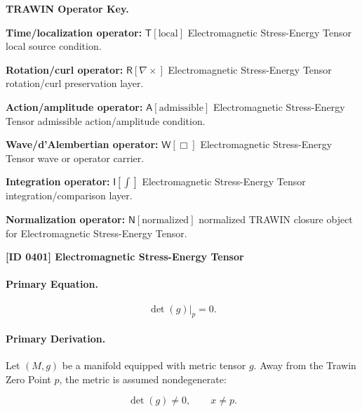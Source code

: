\par\vspace{0.45\baselineskip}
\noindent\begin{minipage}[t]{\linewidth}
\begingroup
\small
\raggedright
\textbf{TRAWIN Operator Key.}\par
\noindent\textbf{Time/localization operator:} $\mathsf{T}\!\left[\mathrm{local}\right]$ Electromagnetic Stress-Energy Tensor local source condition.\par
\noindent\textbf{Rotation/curl operator:} $\mathsf{R}\!\left[\nabla\times\right]$ Electromagnetic Stress-Energy Tensor rotation/curl preservation layer.\par
\noindent\textbf{Action/amplitude operator:} $\mathsf{A}\!\left[\mathrm{admissible}\right]$ Electromagnetic Stress-Energy Tensor admissible action/amplitude condition.\par
\noindent\textbf{Wave/d'Alembertian operator:} $\mathsf{W}\!\left[\Box\right]$ Electromagnetic Stress-Energy Tensor wave or operator carrier.\par
\noindent\textbf{Integration operator:} $\mathsf{I}\!\left[\int\right]$ Electromagnetic Stress-Energy Tensor integration/comparison layer.\par
\noindent\textbf{Normalization operator:} $\mathsf{N}\!\left[\mathrm{normalized}\right]$ normalized TRAWIN closure object for Electromagnetic Stress-Energy Tensor.\par
\endgroup
\end{minipage}

\clearpage
\noindent\textbf{[ID 0401] Electromagnetic Stress-Energy Tensor}\par
\vspace{0.35em}
\paragraph{Primary Equation.}
\begin{equation}
\det(g)\big|_{p}=0 .
\end{equation}

\paragraph{Primary Derivation.}
Let $(M,g)$ be a manifold equipped with metric tensor $g$. Away from the Trawin Zero Point $p$, the metric is assumed nondegenerate:

\begin{equation}
\det(g)\neq 0,
\qquad x\neq p .
\end{equation}

